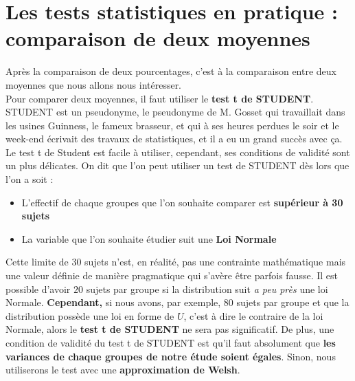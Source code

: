 \section{Les tests statistiques en pratique : comparaison de deux moyennes}
Après la comparaison de deux pourcentages, c'est à la comparaison entre deux moyennes que nous allons nous intéresser.\newline
\\
Pour comparer deux moyennes, il faut utiliser le \textbf{test t de STUDENT}. STUDENT est un pseudonyme, le pseudonyme de M. Gosset qui travaillait dans les usines Guinness, le fameux brasseur, et qui à ses heures perdues le soir et le week-end écrivait des travaux de statistiques, et il a eu un grand succès avec ça.\newline
Le test t de Student est facile à utiliser, cependant, ses conditions de validité sont un plus délicates. \newline 
On dit que l'on peut utiliser un test de STUDENT dès lors que l'on a soit :
\begin{itemize}
\item L'effectif de chaque groupes que l'on souhaite comparer est \textbf{supérieur à 30 sujets}
\item La variable que l'on souhaite étudier suit une \textbf{Loi Normale}
\end{itemize}
Cette limite de $30$ sujets n'est, en réalité, pas une contrainte mathématique mais une valeur définie de manière pragmatique qui s'avère être parfois fausse. Il est possible d'avoir $20$ sujets par groupe si la distribution suit \textit{a peu près} une loi Normale. \newline
\textbf{Cependant, } si nous avons, par exemple, $80$ sujets par groupe et que la distribution possède une loi en forme de $U$, c'est à dire le contraire de la loi Normale, alors le \textbf{test t de STUDENT} ne sera pas significatif.\newline
De plus, une condition de validité du test t de STUDENT est qu'il faut absolument que \textbf{les variances de chaque groupes de notre étude soient égales}. Sinon, nous utiliserons le test avec une \textbf{approximation de Welsh}.
